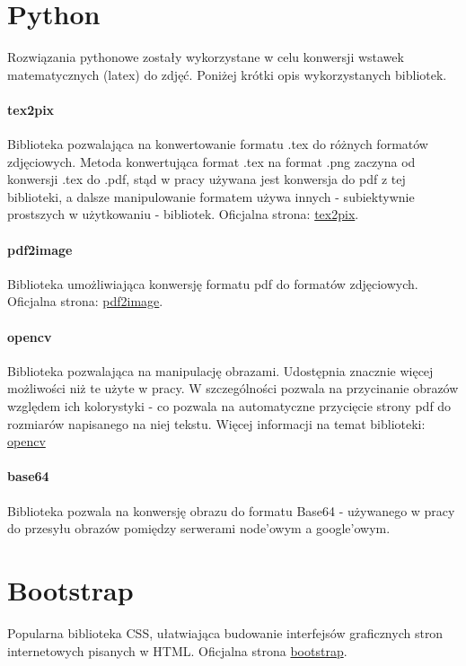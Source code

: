 \section{Python}
Rozwiązania pythonowe zostały wykorzystane w celu konwersji wstawek matematycznych (latex) do zdjęć. Poniżej krótki opis wykorzystanych bibliotek.
\paragraph{tex2pix} Biblioteka pozwalająca na konwertowanie formatu .tex do różnych formatów zdjęciowych. Metoda konwertująca format .tex na format .png zaczyna od konwersji .tex do .pdf, stąd w pracy używana jest konwersja do pdf z tej biblioteki, a dalsze manipulowanie formatem używa innych - subiektywnie prostszych w użytkowaniu - bibliotek. 
\ind Oficjalna strona: \href{https://pypi.org/project/tex2pix/}{tex2pix}.

\paragraph{pdf2image} Biblioteka  umożliwiająca konwersję formatu pdf do formatów zdjęciowych.
\ind Oficjalna strona: \href{https://pypi.org/project/pdf2image/}{pdf2image}.
\paragraph{opencv} Biblioteka pozwalająca na manipulację obrazami. Udostępnia znacznie więcej możliwości niż te użyte w pracy. W szczególności pozwala na przycinanie obrazów względem ich kolorystyki - co pozwala na automatyczne przycięcie strony pdf do rozmiarów napisanego na niej tekstu. Więcej informacji na temat biblioteki: \href{https://pypi.org/project/opencv-python/}{opencv}
\paragraph{base64} Biblioteka pozwala na konwersję obrazu do formatu Base64 - używanego w pracy do przesyłu obrazów pomiędzy serwerami node'owym a google'owym. 

\section{Bootstrap}  
Popularna biblioteka CSS, ułatwiająca budowanie interfejsów graficznych stron internetowych pisanych w HTML. Oficjalna strona \href{https://getbootstrap.com/}{bootstrap}.




